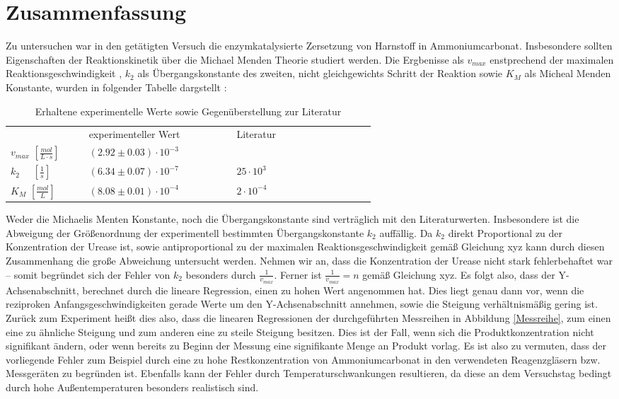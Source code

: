  

\section{Zusammenfassung}
Zu untersuchen war in den getätigten Versuch die enzymkatalysierte Zersetzung von Harnstoff in Ammoniumcarbonat. Insbesondere sollten Eigenschaften der Reaktionskinetik über die Michael Menden Theorie studiert werden. Die Ergbenisse als $v_{max}$ enstprechend der maximalen Reaktionsgeschwindigkeit , $k_2$ als Übergangskonstante des zweiten, nicht gleichgewichts Schritt der Reaktion sowie $K_M$ als Micheal Menden Konstante, wurden in folgender Tabelle dargstellt :
\begin{table}[H]
	\centering
	\label{Erg}
	\caption{Erhaltene experimentelle Werte sowie Gegenüberstellung zur Literatur}
	\renewcommand*{\arraystretch}{1.4}
	\begin{tabular}{C{0.1\linewidth}|C{0.25\linewidth}C{0.25\linewidth}}
				& experimenteller Wert & Literatur\cite{otto} \\
		$ v_{max}\,\, [\si{\frac{mol}{L\cdot s}}] $ & $(2.92 \pm 0.03) \cdot 10^{-3}$ &   \\
		$k_2\,\,\,\,\,\,\,\, [\si{\frac{1}{s}}]$ & $(6.34 \pm 0.07)\cdot 10^{-7}$ &  $25 \cdot 10^3$\\
		$K_M\,\, [\si{\frac{mol}{L}}]$& $(8.08 \pm 0.01) \cdot 10^{-4}$& $2 \cdot 10^{-4}$\\
	\end{tabular}
\end{table}
Weder die Michaelis Menten Konstante, noch die Übergangskonstante sind verträglich mit den Literaturwerten. Insbesondere ist die Abweigung der Größenordnung der experimentell bestimmten Übergangskonstante $k_2$ auffällig. Da $k_2$ direkt Proportional zu der Konzentration der Urease ist, sowie antiproportional zu der maximalen Reaktionsgeschwindigkeit gemäß Gleichung xyz kann durch diesen Zusammenhang die große Abweichung untersucht werden. Nehmen wir an, dass die Konzentration der Urease nicht stark fehlerbehaftet war -- somit begründet sich der Fehler von $k_2$ besonders durch $\frac{1}{v_{max}}$. Ferner ist $\frac{1}{v_{max}} = n$ gemäß Gleichung xyz. Es folgt also, dass der Y-Achsenabschnitt, berechnet durch die lineare Regression, einen zu hohen Wert angenommen hat. Dies liegt genau dann vor, wenn die reziproken Anfangsgeschwindigkeiten gerade Werte um den Y-Achsenabschnitt annehmen, sowie die Steigung verhältnismäßig gering ist. Zurück zum Experiment heißt dies also, dass die linearen Regressionen der durchgeführten Messreihen in Abbildung \ref{Messreihe}, zum einen eine zu ähnliche Steigung und zum anderen eine zu steile Steigung besitzen. Dies ist der Fall, wenn sich die Produktkonzentration nicht signifikant ändern, oder wenn bereits zu Beginn der Messung eine signifikante Menge an Produkt vorlag. Es ist also zu vermuten, dass der vorliegende Fehler zum Beispiel durch eine zu hohe Restkonzentration von Ammoniumcarbonat in den verwendeten Reagenzgläsern bzw. Messgeräten zu begründen ist. Ebenfalls kann der Fehler durch Temperaturschwankungen resultieren, da diese an dem Versuchstag bedingt durch hohe Außentemperaturen besonders realistisch sind.




